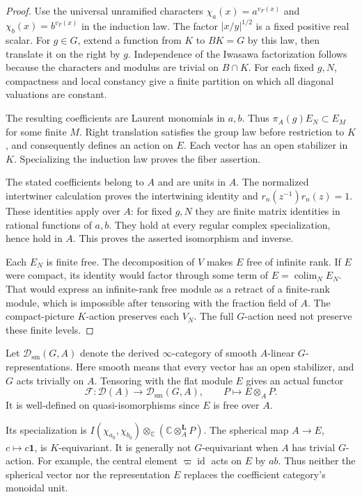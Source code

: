 \begin{proof}
Use the universal unramified characters
$\chi_a(x)=a^{v_F(x)}$ and $\chi_b(x)=b^{v_F(x)}$ in the induction law.
The factor $|x/y|^{1/2}$ is a fixed positive real scalar.
For $g\in G$, extend a function from $K$ to $BK=G$ by this law,
then translate it on the right by $g$.
Independence of the Iwasawa factorization follows because the
characters and modulus are trivial on $B\cap K$.
For each fixed $g,N$, compactness and local constancy give a finite partition
on which all diagonal valuations are constant.

The resulting coefficients are Laurent monomials in $a,b$.
Thus $\pi_A(g)E_N\subset E_M$ for some finite $M$.
Right translation satisfies the group law before restriction to $K$,
and consequently defines an action on $E$.
Each vector has an open stabilizer in $K$.
Specializing the induction law proves the fiber assertion.

The stated coefficients belong to $A$ and are units in $A$.
The normalized intertwiner calculation proves the intertwining identity
and $r_n(z^{-1})r_n(z)=1$.
These identities apply over $A$: for fixed $g,N$ they are finite matrix
identities in rational functions of $a,b$.
They hold at every regular complex specialization, hence hold in $A$.
This proves the asserted isomorphism and inverse.

Each $E_N$ is finite free.
The decomposition of $V$ makes $E$ free of infinite rank.
If $E$ were compact, its identity would factor through some term of
$E=\operatorname{colim}_NE_N$.
That would express an infinite-rank free module as a retract of a finite-rank module,
which is impossible after tensoring with the fraction field of $A$.
The compact-picture $K$-action preserves each $V_N$.
The full $G$-action need not preserve these finite levels.
\end{proof}

Let $\mathcal D_{\mathrm{sm}}(G,A)$ denote the derived $\infty$-category
of smooth $A$-linear $G$-representations.
Here smooth means that every vector has an open stabilizer, and $G$ acts trivially on $A$.
Tensoring with the flat module $E$ gives an actual functor
\[
 \mathcal F:\mathcal D(A)\longrightarrow\mathcal D_{\mathrm{sm}}(G,A),
 \qquad P\longmapsto E\otimes_A P.
\]
It is well-defined on quasi-isomorphisms since $E$ is free over $A$.

Its specialization is
$I(\chi_{a_0},\chi_{b_0})\otimes_{\mathbb C}
(\mathbb C\otimes_A^{\mathbf L}P)$.
The spherical map $A\to E$, $c\mapsto c\mathbf1$, is $K$-equivariant.
It is generally not $G$-equivariant when $A$ has trivial $G$-action.
For example, the central element $\varpi\operatorname{id}$ acts on $E$ by $ab$.
Thus neither the spherical vector nor the representation $E$
replaces the coefficient category's monoidal unit.

